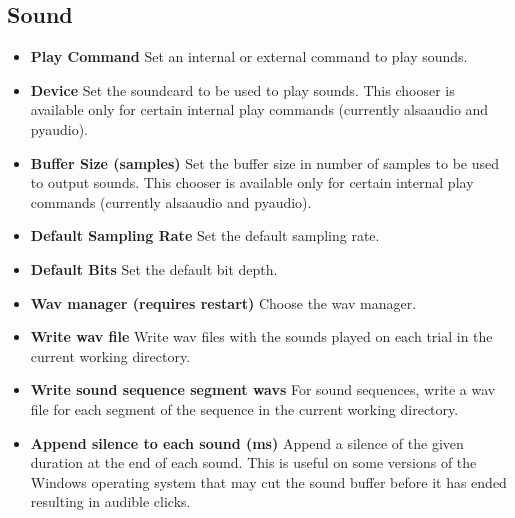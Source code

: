\documentclass[a4paper,12pt,english]{sphinxmanual}
\begin{document}
\subsection{Sound}
\label{graphical_user_interface:sound}\label{graphical_user_interface:sec-edit-pref-dia-sound}\begin{itemize}
\item {} 
\textbf{Play Command} Set an internal or external command to play sounds.

\item {} 
\textbf{Device} Set the soundcard to be used to play sounds. This chooser
is available only for certain internal play commands (currently
alsaaudio and pyaudio).

\item {} 
\textbf{Buffer Size (samples)} Set the buffer size in number of samples to
be used to output sounds. This chooser is available only for certain
internal play commands (currently alsaaudio and pyaudio).

\item {} 
\textbf{Default Sampling Rate} Set the default sampling rate.

\item {} 
\textbf{Default Bits} Set the default bit depth.

\item {} 
\textbf{Wav manager (requires restart)} Choose the wav manager.

\item {} 
\textbf{Write wav file} Write wav files with the sounds played on each
trial in the current  working directory.

\item {} 
\textbf{Write sound sequence segment wavs} For sound sequences, write a
wav file for each segment of the sequence in the current
 working directory.

\item {} 
\textbf{Append silence to each sound (ms)} Append a silence of the given
duration at the end of each sound. This is useful on some versions of
the Windows operating system that may cut the sound buffer before it
has ended resulting in audible clicks.

\end{itemize}
\end{document}
